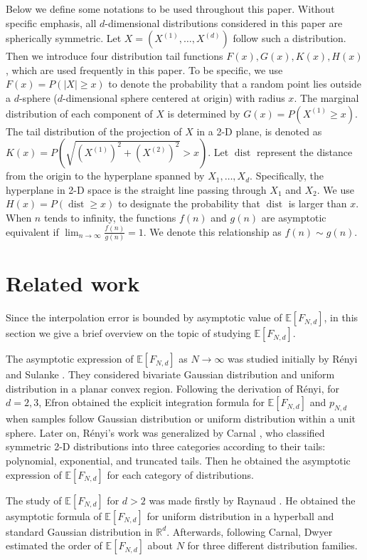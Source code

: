 \documentclass[conference,a4paper]{IEEEtran}
\DeclareMathOperator{\dist}{dist}
\def\E{\mathbb{E}}
\begin{document}
Below we define some notations to be used throughout this paper.
Without specific emphasis, all $d$-dimensional distributions considered in this paper are spherically symmetric.
Let $X=(X^{(1)},\dots, X^{(d)})$ follow such a distribution.
Then we introduce four distribution tail functions $F(x),G(x),K(x),H(x)$,
which are used frequently in this paper. To be specific, we use $F(x)=P(|X|\geq x)$ to denote the probability that a random point lies outside
a $d$-sphere ($d$-dimensional sphere centered at origin) with radius $x$.
The marginal distribution of each component of $X$ is determined by $G(x)=P(X^{(1)}\geq x)$.
The tail distribution of the projection of $X$ in a 2-D plane, is denoted as $K(x)=P(\sqrt{(X^{(1)})^2+(X^{(2)})^2}>x)$.
Let $\dist$ represent the distance from the origin to the hyperplane spanned by $X_1, \dots, X_d$.
Specifically, the hyperplane in 2-D space is the straight line passing through $X_1$ and $X_2$.
We use $H(x)=P(\dist\geq x)$ to designate the probability that $\dist$ is larger than $x$.
When $n$ tends to infinity, the functions $f(n)$ and $g(n)$ are asymptotic equivalent if $\lim_{n\to \infty} \frac{f(n)}{g(n)}=1$.
We denote this relationship as $f(n) \sim g(n)$.

\section{Related work}
Since the interpolation error is bounded by
asymptotic value of $\E[F_{N,d}]$,
in this section we give a brief overview on the topic of studying $\E[F_{N,d}]$.

The asymptotic expression of $\E[F_{N,d}]$ as $N\to \infty$
was studied initially by R{\'e}nyi and Sulanke \cite{renyi1963konvexe}.
They considered
bivariate Gaussian distribution and uniform distribution
in a planar convex region.
Following the derivation of R{\'e}nyi, for $d=2,3$, Efron \cite{efron1965convex} obtained the explicit integration formula for $\E[F_{N,d}]$ and $p_{N,d}$ 
when samples follow Gaussian distribution or uniform distribution within a unit sphere.
Later on,  R{\'e}nyi's work was generalized by
Carnal \cite{carnal1970konvexe}, who
classified symmetric 2-D distributions
into three categories according to their tails:
polynomial, exponential, and truncated tails.
Then he obtained the asymptotic expression of $\E[F_{N,d}]$
for each category of distributions.




The study of $\E[F_{N,d}]$ for $d>2$ was made firstly by
Raynaud
\cite{raynaud1970enveloppe}.
He obtained the asymptotic formula of $\E[F_{N,d}]$
for uniform distribution in a hyperball
and standard Gaussian distribution in $\mathbb{R}^d$.
Afterwards, following Carnal, Dwyer \cite{dwyer1991convex}
estimated the order of $\E[F_{N,d}]$ about $N$
for three different distribution families.
\end{document}
